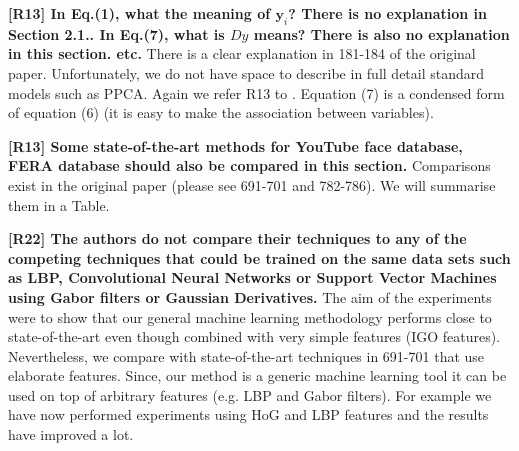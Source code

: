 \documentclass[10pt,twocolumn,letterpaper]{article}
\begin{document}
\textbf{[R13] In Eq.(1), what the meaning of $\mathbf{y}_i$? There is no explanation in Section 2.1.. In Eq.(7), what is $Dy$ means? There is also no explanation in this section. etc.}
There is a clear explanation in 181-184 of the original paper. Unfortunately, we do not have space to describe in full detail standard models such as PPCA. Again we refer R13 to  \cite{bishop2006pattern,roweis1999unifying}. Equation (7) is a condensed form of equation (6) (it is easy to make the association between variables).






\textbf{[R13] Some state-of-the-art methods for YouTube face database, FERA database should also be compared in this section.} 
Comparisons exist in the original paper (please see 691-701 and 782-786). We will summarise them in a Table.




\textbf{[R22]  The authors do not compare their techniques to any of the competing techniques that could be trained on the same data sets such as LBP, Convolutional Neural Networks or Support Vector Machines using Gabor filters or Gaussian Derivatives.}
The aim of the experiments were to show that our general machine learning methodology performs close to state-of-the-art even though combined with very simple features (IGO features).  Nevertheless, we compare with state-of-the-art techniques in 691-701 that use elaborate features.
Since, our method is a generic machine learning tool it can be used on top of arbitrary features (e.g. LBP and Gabor filters). For example we have now performed experiments using HoG and LBP features and the results have improved a lot. 
\end{document}
